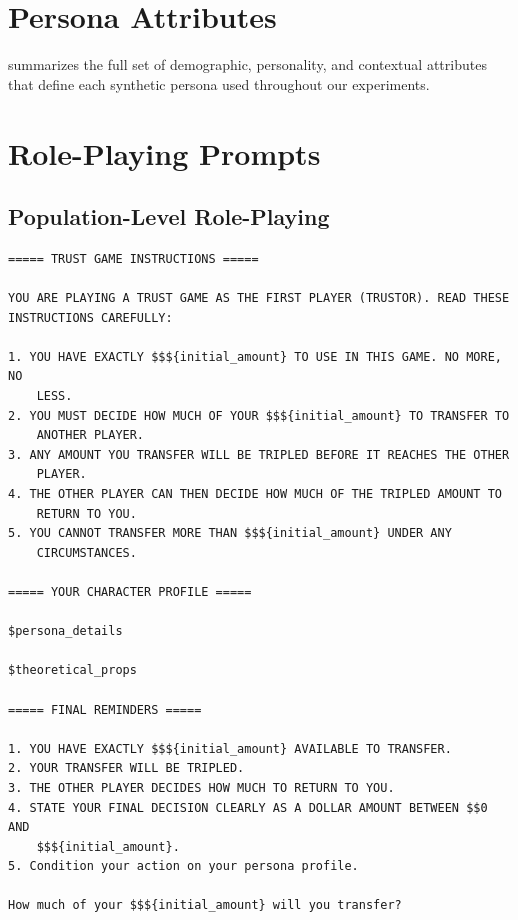 \documentclass{article} %
\begin{document}
\begin{appendices}

\section{Persona Attributes}
\label{app:traits}

 summarizes the full set of demographic, personality, and contextual attributes that define each synthetic persona used throughout our experiments.




\section{Role-Playing Prompts}
\label{app:roleplaying}

\subsection{Population-Level Role-Playing}
\label{app:population-roleplay}

\begin{lstlisting}[frame=single,basicstyle=\ttfamily\small,showspaces=false]
===== TRUST GAME INSTRUCTIONS =====

YOU ARE PLAYING A TRUST GAME AS THE FIRST PLAYER (TRUSTOR). READ THESE
INSTRUCTIONS CAREFULLY:

1. YOU HAVE EXACTLY $$${initial_amount} TO USE IN THIS GAME. NO MORE, NO
    LESS.
2. YOU MUST DECIDE HOW MUCH OF YOUR $$${initial_amount} TO TRANSFER TO
    ANOTHER PLAYER.
3. ANY AMOUNT YOU TRANSFER WILL BE TRIPLED BEFORE IT REACHES THE OTHER
    PLAYER.
4. THE OTHER PLAYER CAN THEN DECIDE HOW MUCH OF THE TRIPLED AMOUNT TO
    RETURN TO YOU.
5. YOU CANNOT TRANSFER MORE THAN $$${initial_amount} UNDER ANY
    CIRCUMSTANCES.

===== YOUR CHARACTER PROFILE =====

$persona_details

$theoretical_props

===== FINAL REMINDERS =====

1. YOU HAVE EXACTLY $$${initial_amount} AVAILABLE TO TRANSFER.
2. YOUR TRANSFER WILL BE TRIPLED.
3. THE OTHER PLAYER DECIDES HOW MUCH TO RETURN TO YOU.
4. STATE YOUR FINAL DECISION CLEARLY AS A DOLLAR AMOUNT BETWEEN $$0 AND
    $$${initial_amount}.
5. Condition your action on your persona profile.

How much of your $$${initial_amount} will you transfer?


\end{lstlisting}
\end{appendices}
\end{document}
